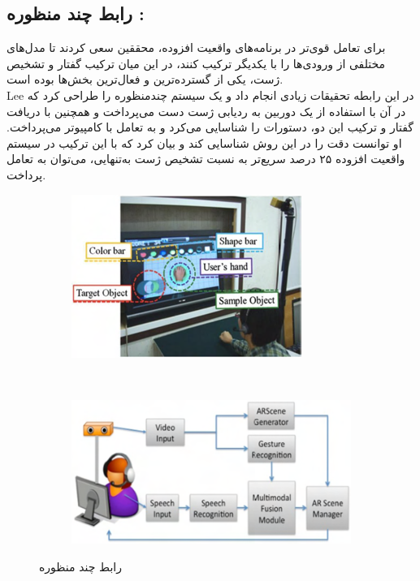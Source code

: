 \subsection{رابط چند منظوره\protect{} :}
برای تعامل قوی‌تر در برنامه‌های واقعیت افزوده، محققین سعی کردند تا مدل‌های مختلفی از ورودی‌ها را با یکدیگر ترکیب کنند، در این میان ترکیب گفتار و تشخیص ژست، یکی از گسترده‌ترین و فعال‌ترین بخش‌ها بوده است.
\\
Lee در این رابطه تحقیقات زیادی انجام داد و یک سیستم چندمنظوره را طراحی کرد که در آن با استفاده از یک دوربین به  ردیابی ژست دست می‌پرداخت و همچنین با دریافت گفتار و ترکیب این دو، دستورات را شناسایی می‌کرد و به تعامل با کامپیوتر می‌پرداخت.
او توانست دقت را در این روش شناسایی کند و بیان کرد که با این ترکیب در سیستم واقعیت افزوده ۲۵ درصد سریع‌تر به نسبت تشخیص ژست به‌تنهایی، می‌توان به تعامل پرداخت\cite{Lee2}.
\begin{figure}[!ht]
	\centering
	\begin{subfigure}[b]{0.5\textwidth}
		\includegraphics[width=\textwidth]{image/lee2}
		
		
	\end{subfigure}
	~ %
	\begin{subfigure}[b]{0.4\textwidth}
		\includegraphics[width=\textwidth]{image/lee1}
		
	\end{subfigure}
	\caption{رابط چند منظوره\cite{Lee2}}\label{fig:lee2}
\end{figure}